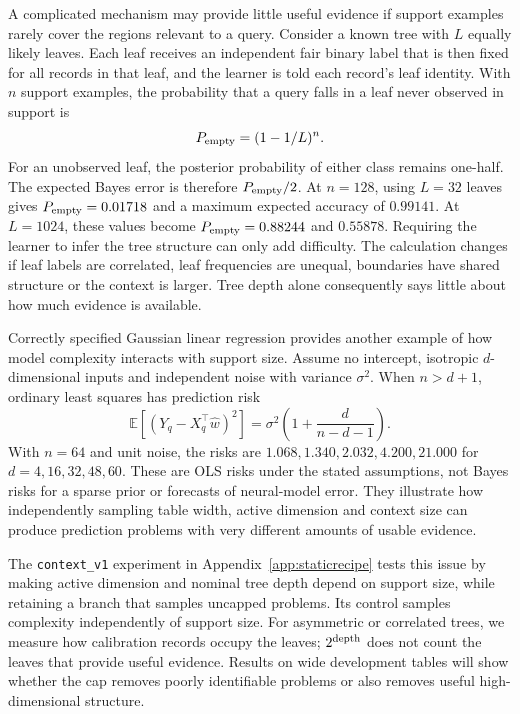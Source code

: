 \documentclass[11pt]{article}
\newcommand{\E}{\mathbb{E}}
\begin{document}
A complicated mechanism may provide little useful evidence if support examples rarely cover the regions relevant to a query. Consider a known tree with $L$ equally likely leaves. Each leaf receives an independent fair binary label that is then fixed for all records in that leaf, and the learner is told each record's leaf identity. With $n$ support examples, the probability that a query falls in a leaf never observed in support is
\begin{equation}
P_{\rm empty}=(1-1/L)^n.
\end{equation}
For an unobserved leaf, the posterior probability of either class remains one-half. The expected Bayes error is therefore $P_{\rm empty}/2$. At $n=128$, using $L=32$ leaves gives $P_{\rm empty}=0.01718$ and a maximum expected accuracy of $0.99141$. At $L=1024$, these values become $P_{\rm empty}=0.88244$ and $0.55878$. Requiring the learner to infer the tree structure can only add difficulty. The calculation changes if leaf labels are correlated, leaf frequencies are unequal, boundaries have shared structure or the context is larger. Tree depth alone consequently says little about how much evidence is available.

Correctly specified Gaussian linear regression provides another example of how model complexity interacts with support size. Assume no intercept, isotropic $d$-dimensional inputs and independent noise with variance $\sigma^2$. When $n>d+1$, ordinary least squares has prediction risk
\begin{equation}
\E[(Y_q-X_q^\top\widehat w)^2]=\sigma^2\left(1+\frac{d}{n-d-1}\right).
\end{equation}
With $n=64$ and unit noise, the risks are $1.068,1.340,2.032,4.200,21.000$ for $d=4,16,32,48,60$. These are OLS risks under the stated assumptions, not Bayes risks for a sparse prior or forecasts of neural-model error. They illustrate how independently sampling table width, active dimension and context size can produce prediction problems with very different amounts of usable evidence.

The \texttt{context\_v1} experiment in Appendix~\ref{app:staticrecipe} tests this issue by making active dimension and nominal tree depth depend on support size, while retaining a branch that samples uncapped problems. Its control samples complexity independently of support size. For asymmetric or correlated trees, we measure how calibration records occupy the leaves; $2^{\rm depth}$ does not count the leaves that provide useful evidence. Results on wide development tables will show whether the cap removes poorly identifiable problems or also removes useful high-dimensional structure.
\end{document}
